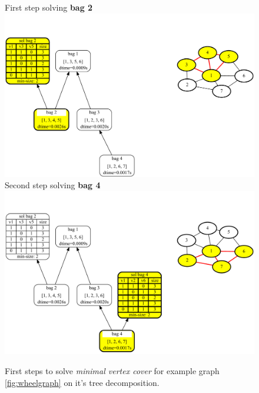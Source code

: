 \documentclass[a4paper, 12pt, bibliography=totoc]{scrartcl}
\begin{document}
\begin{figure}[H]
	\centering
		First step solving \textbf{bag 2}
	\includegraphics[width=0.9\linewidth]{images/WheelGraph7/combined2.pdf} \vspace{1em}\\
	Second step solving \textbf{bag 4}\\
	
		\includegraphics[width=0.9\linewidth]{images/WheelGraph7/combined3.pdf}
	\caption{First steps to solve \textit{minimal vertex cover} for example graph \ref{fig:wheelgraph} on it's tree decomposition.}
	\label{fig:wheelgraphc23}
\end{figure}
\end{document}

